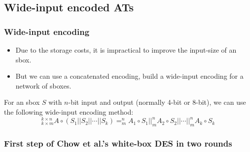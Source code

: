\documentclass{beamer}
\begin{document}
\subsection{Wide-input encoded ATs}

\frame
{
\frametitle{Wide-input encoding}
\begin{itemize}
\item Due to the storage costs, it is impractical to improve the input-size of an sbox.

\item But we can use a concatenated encoding, build a wide-input encoding for a network of sboxes.
\end{itemize}

For an sbox $S$ with $n$-bit input and output (normally 4-bit or 8-bit), we can use the following wide-input encoding method:
\[^{k\times n}_{k\times m}A \circ (S_{1}||S_{2}||\cdots||S_{k})= ^{n}_{m}A_{1} \circ S_{1}||^{n}_{m}A_{2} \circ S_{2}||\cdots||^{n}_{m}A_{k} \circ S_{k}\]
}

\frame
{
\frametitle{First step of Chow et al.'s white-box DES in two rounds}
\begin{center}
\end{center}
}
\end{document}
